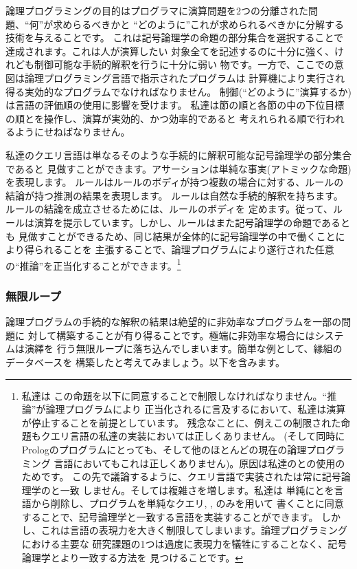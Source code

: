 論理プログラミングの目的はプログラマに演算問題を2つの分離された問題、``何''が求めらるべきかと
``どのように''これが求められるべきかに分解する技術を与えることです。
これは記号論理学の命題の部分集合を選択することで達成されます。これは人が演算したい
対象全てを記述するのに十分に強く、けれども制御可能な手続的解釈を行うに十分に弱い
物です。一方で、ここでの意図は論理プログラミング言語で指示されたプログラムは
計算機により実行され得る実効的なプログラムでなければなりません。
制御(``どのように''演算するか)は言語の評価順の使用に影響を受けます。
私達は節の順と各節の中の下位目標の順とを操作し、演算が実効的、かつ効率的であると
考えれられる順で行われるようにせねばなりません。

私達のクエリ言語は単なるそのような手続的に解釈可能な記号論理学の部分集合であると
見做すことができます。アサーションは単純な事実(アトミックな命題)を表現します。
ルールはルールのボディが持つ複数の場合に対する、ルールの結論が持つ推測の結果を表現します。
ルールは自然な手続的解釈を持ちます。ルールの結論を成立させるためには、ルールのボディを
定めます。従って、ルールは演算を提示しています。しかし、ルールはまた記号論理学の命題であるとも
見做すことができるため、同じ結果が全体的に記号論理学の中で働くことにより得られることを
主張することで、論理プログラムにより遂行された任意の``推論''を正当化することができます。\footnote{私達は
この命題を以下に同意することで制限しなければなりません。``推論''が論理プログラムにより
正当化されるに言及するにおいて、私達は演算が停止することを前提としています。
残念なことに、例えこの制限された命題もクエリ言語の私達の実装においては正しくありません。
(そして同時にPrologのプログラムにとっても、そして他のほとんどの現在の論理プログラミング
言語においてもこれは正しくありません)。原因は私達のとの使用のためです。
この先で議論するように、クエリ言語で実装されたは常に記号論理学のと一致
しません。そしては複雑さを増します。私達は
単純にとを言語から削除し、プログラムを単純なクエリ, , のみを用いて
書くことに同意することで、記号論理学と一致する言語を実装することができます。
しかし、これは言語の表現力を大きく制限してしまいます。論理プログラミングにおける主要な
研究課題の1つは過度に表現力を犠牲にすることなく、記号論理学とより一致する方法を
見つけることです。}

\subsubsection*{無限ループ}


論理プログラムの手続的な解釈の結果は絶望的に非効率なプログラムを一部の問題に
対して構築することが有り得ることです。極端に非効率な場合にはシステムは演繹を
行う無限ループに落ち込んでしまいます。簡単な例として、縁組のデータベースを
構築したと考えてみましょう。以下を含みます。

